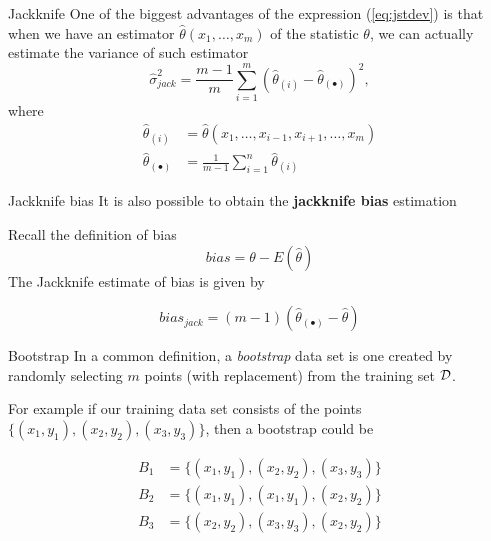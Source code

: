\documentclass{beamer}
\begin{document}
\begin{frame}{Jackknife}
	One of the biggest advantages of the expression (\ref{eq:jstdev}) is that when we  have an estimator $\hat{\theta}(x_1,\ldots, x_m)$ of the statistic $\theta$, we can actually estimate the variance of such estimator
	\begin{equation*}
		\hat{\sigma}_{jack}^2= \frac{m-1}{m} \sum_{i=1}^m (\hat{\theta}_{(i)}- \hat{\theta}_{(\bullet)})^2,
	\end{equation*}
where
\begin{equation*}
	\begin{split}
		\hat{\theta}_{(i)}&= \hat{\theta}(x_1, \ldots, x_{i-1},x_{i+1},\ldots, x_m) \\
		\hat{\theta}_{(\bullet)}&= \frac{1}{m-1} \sum_{i=1}^n \hat{\theta}_{(i)} 
	\end{split}
\end{equation*}

\end{frame}
		
\begin{frame}{Jackknife bias}
	It is also possible to obtain the {\bf jackknife bias} estimation
	
	Recall the definition of bias
	\begin{equation*}
		bias = \theta - E(\hat{\theta})
	\end{equation*} 
The Jackknife estimate of bias is given by

\begin{equation*}
	bias_{jack}= (m-1) (\hat{\theta}_{(\bullet)}- \hat{\theta})
\end{equation*}
\end{frame}		
		
\begin{frame}{Bootstrap}
	In a common definition, a {\it bootstrap} data set is one created by randomly selecting $m$ points (with replacement) from the training set $\cal{D}$.
	
	For example if our training data set consists of the points $\{(x_1,y_1),(x_2,y_2),(x_3,y_3)\}$, then a bootstrap could be 
	
	\begin{equation*}
		\begin{split}
				B_1&=\{(x_1,y_1),(x_2,y_2),(x_3,y_3)\}\\
				B_2&=\{(x_1,y_1),(x_1,y_1),(x_2,y_2)\} \\
				B_3&=\{(x_2,y_2),(x_3,y_3),(x_2,y_2)\} 
		\end{split}
	\end{equation*}
	 
\end{frame}		
\end{document}

